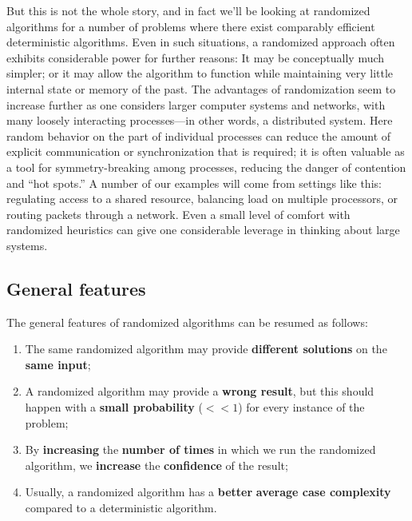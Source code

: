 But this is not the whole story, and in fact we’ll be looking at randomized algorithms for a number of problems where there exist comparably efficient deterministic algorithms. Even in such situations, a randomized approach often exhibits considerable power for further reasons: It may be conceptually much simpler; or it may allow the algorithm to function while maintaining very little internal state or memory of the past. The advantages of randomization seem to increase further as one considers larger computer systems and networks, with many loosely interacting processes—in other words, a distributed system. Here random behavior on the part of individual processes can reduce the amount of explicit communication or synchronization that is required; it is often valuable as a tool for symmetry-breaking among processes, reducing the danger of contention and “hot spots.” A number of our examples will come from settings like this: regulating access to a shared resource, balancing load on multiple processors, or routing packets through a network. Even a small level of comfort with randomized heuristics can give one considerable leverage in thinking about large systems.

\subsection{General features}
The general features of randomized algorithms can be resumed as follows:
\begin{enumerate}
    \item The same randomized algorithm may provide \textbf{different solutions} on the \textbf{same input};
    \item A randomized algorithm may provide a \textbf{wrong result}, but this should happen with a \textbf{small probability} ($<< 1$) for every instance of the problem;
    \item By \textbf{increasing} the \textbf{number of times} in which we run the randomized algorithm, we \textbf{increase} the \textbf{confidence} of the result;
    \item Usually, a randomized algorithm has a \textbf{better} \textbf{average case complexity} compared to a deterministic algorithm.
\end{enumerate}

